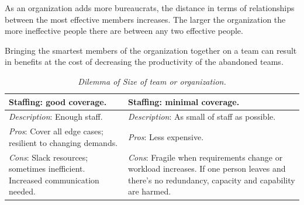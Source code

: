 As an organization adds more bureaucrats, the distance in terms of relationships between the most effective members increases.
The larger the organization the more ineffective people there are between any two effective people. 

Bringing the smartest members of the organization together on a team can result in benefits at the cost of decreasing the productivity of the abandoned teams. 


\begin{center}
\begin{table}[H] %
\begin{tabular}{ | m{\dilemmatablewidth}| m{\dilemmatablewidth} | } 
  \hline
  \textbf{Staffing: good coverage.} &
  \textbf{Staffing: minimal coverage.} \\
  \hline
  \textit{Description}: Enough staff. &
  \textit{Description}: As small of staff as possible. \\  
  \hline
  \textit{Pros}: Cover all edge cases; resilient to changing demands. &
  \textit{Pros}: Less expensive. \\
  \hline
  \textit{Cons}: Slack resources; sometimes inefficient. Increased communication needed. & 
  \textit{Cons}: Fragile when requirements change or workload increases. If one person leaves and there's no redundancy, capacity and capability are harmed.  \\
  \hline
\end{tabular}
\caption{
\textit{Dilemma of Size of team or organization.}
}
\label{table:staff-many-vs-few}
\end{table}
\end{center}



